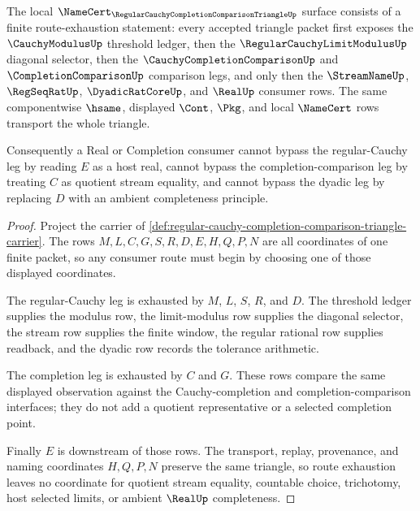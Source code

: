 \begin{theorem}
\label{thm:regular-cauchy-completion-comparison-triangle-namecert-obligations}
The local $\NameCert_{\RegularCauchyCompletionComparisonTriangleUp}$ surface consists of a finite route-exhaustion statement: every accepted triangle packet first exposes the $\CauchyModulusUp$ threshold ledger, then the $\RegularCauchyLimitModulusUp$ diagonal selector, then the $\CauchyCompletionComparisonUp$ and $\CompletionComparisonUp$ comparison legs, and only then the $\StreamNameUp$, $\RegSeqRatUp$, $\DyadicRatCoreUp$, and $\RealUp$ consumer rows. The same componentwise $\hsame$, displayed $\Cont$, $\Pkg$, and local $\NameCert$ rows transport the whole triangle.

Consequently a Real or Completion consumer cannot bypass the regular-Cauchy leg by reading $E$ as a host real, cannot bypass the completion-comparison leg by treating $C$ as quotient stream equality, and cannot bypass the dyadic leg by replacing $D$ with an ambient completeness principle.
\end{theorem}
\begin{proof}
Project the carrier of \autoref{def:regular-cauchy-completion-comparison-triangle-carrier}. The rows $M,L,C,G,S,R,D,E,H,Q,P,N$ are all coordinates of one finite packet, so any consumer route must begin by choosing one of those displayed coordinates.

The regular-Cauchy leg is exhausted by $M$, $L$, $S$, $R$, and $D$. The threshold ledger supplies the modulus row, the limit-modulus row supplies the diagonal selector, the stream row supplies the finite window, the regular rational row supplies readback, and the dyadic row records the tolerance arithmetic.

The completion leg is exhausted by $C$ and $G$. These rows compare the same displayed observation against the Cauchy-completion and completion-comparison interfaces; they do not add a quotient representative or a selected completion point.

Finally $E$ is downstream of those rows. The transport, replay, provenance, and naming coordinates $H,Q,P,N$ preserve the same triangle, so route exhaustion leaves no coordinate for quotient stream equality, countable choice, trichotomy, host selected limits, or ambient $\RealUp$ completeness.
\end{proof}


